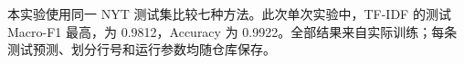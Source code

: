 本实验使用同一 NYT 测试集比较七种方法。此次单次实验中，TF-IDF 的测试 Macro-F1 最高，为 0.9812，Accuracy 为 0.9922。全部结果来自实际训练；每条测试预测、划分行号和运行参数均随仓库保存。
